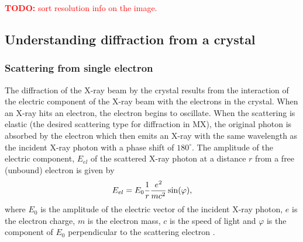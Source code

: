         \textcolor{red}{
            \begin{myenumerate}
                \item \hypertarget{todo:sort resolution}{\textbf{TODO:} sort resolution info on the image.}
            \end{myenumerate}
        }
    \subsection{Understanding diffraction from a crystal}
    \label{sub:Understanding diffraction from a crystal}

        \subsubsection{Scattering from single electron}
        \label{subs:Scattering from single electron}
            The diffraction of the X-ray beam by the crystal results from the interaction of the electric component of the X-ray beam with the electrons in the crystal.
            When an X-ray hits an electron, the electron begins to oscillate.
            When the scattering is elastic (the desired scattering type for diffraction in MX), the original photon is absorbed by the electron which then emits an X-ray with the same wavelength as the incident X-ray photon with a phase shift of $180^{\circ}$.
            The amplitude of the electric component, $E_{el}$ of the scattered X-ray photon at a distance $r$ from a free (unbound) electron is given by
            \begin{equation}
                E_{el} = E_0 \frac{1}{r}\frac{e^2}{mc^2} \sin(\varphi),
            \end{equation}
            where $E_0$ is the amplitude of the electric vector of the incident X-ray photon, $e$ is the electron charge, $m$ is the electron mass, $c$ is the speed of light and $\varphi$ is the component of $E_0$ perpendicular to the scattering electron \cite{drenth2012}.

